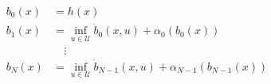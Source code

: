 \documentclass[preview]{standalone}
\begin{document}
\begin{align*}
b_0(x) &= h(x)\\ b_1(x) &= \inf_{u \in \mathcal{U}} \dot b_0(x, u) + \alpha_0 (b_0(x))\\ &\quad \vdots\\ b_N(x) &= \inf_{u \in \mathcal{U}} \dot b_{N-1}(x, u) + \alpha_{N-1} (b_{N-1}(x))
\end{align*}
\end{document}
